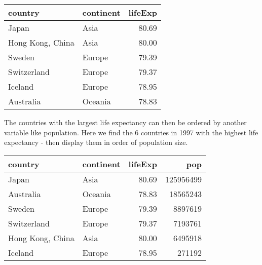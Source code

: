 \documentclass[
]{book}
\newenvironment{Shaded}{\begin{snugshade}}{\end{snugshade}}
\newcommand{\DataTypeTok}[1]{\textcolor[rgb]{0.13,0.29,0.53}{#1}}
\newcommand{\DecValTok}[1]{\textcolor[rgb]{0.00,0.00,0.81}{#1}}
\newcommand{\KeywordTok}[1]{\textcolor[rgb]{0.13,0.29,0.53}{\textbf{#1}}}
\newcommand{\NormalTok}[1]{#1}
\newcommand{\OperatorTok}[1]{\textcolor[rgb]{0.81,0.36,0.00}{\textbf{#1}}}
\newcommand{\StringTok}[1]{\textcolor[rgb]{0.31,0.60,0.02}{#1}}
\begin{document}
\begin{tabular}{l|l|r}
\hline
country & continent & lifeExp\\
\hline
Japan & Asia & 80.69\\
\hline
Hong Kong, China & Asia & 80.00\\
\hline
Sweden & Europe & 79.39\\
\hline
Switzerland & Europe & 79.37\\
\hline
Iceland & Europe & 78.95\\
\hline
Australia & Oceania & 78.83\\
\hline
\end{tabular}

The countries with the largest life expectancy can then be ordered by another variable like population. Here we find the 6 countries in 1997 with the highest life expectancy - then display them in order of population size.

\begin{Shaded}
\end{Shaded}

\begin{tabular}{l|l|r|r}
\hline
country & continent & lifeExp & pop\\
\hline
Japan & Asia & 80.69 & 125956499\\
\hline
Australia & Oceania & 78.83 & 18565243\\
\hline
Sweden & Europe & 79.39 & 8897619\\
\hline
Switzerland & Europe & 79.37 & 7193761\\
\hline
Hong Kong, China & Asia & 80.00 & 6495918\\
\hline
Iceland & Europe & 78.95 & 271192\\
\hline
\end{tabular}
\end{document}
